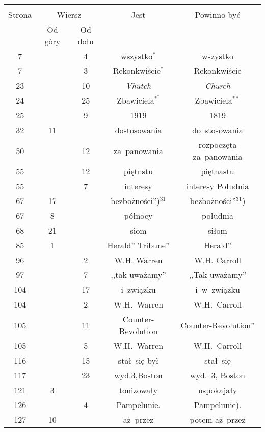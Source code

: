 \documentclass[a4paper,11pt]{article}
\begin{document}
\newpage
{}
\begin{center}
  \begin{tabular}{|c|c|c|c|c|}
    \hline
    & \multicolumn{2}{c|}{} & & \\
    Strona & \multicolumn{2}{c|}{Wiersz} & Jest
                              & Powinno być \\ \cline{2-3}
    & Od góry & Od dołu & & \\
    \hline
    7   & &  4 & wszystko$^{ * }$ & wszystko \\
    7   & &  3 & Rekonkwiście$^{ * }$ & Rekonkwiście \\
    23  & & 10 & \emph{Vhutch} & \emph{Church} \\
    24  & & 25 & Zbawiciela$^{ *^{ * } }$ & Zbawiciela$^{ ** }$ \\
    25  & &  9 & 1919 & 1819 \\
    32  & 11 & & dostosowania & do~stosowania \\
    50  & & 12 & za~panowania & rozpoczęta za~panowania \\
    55  & & 12 & piętnstu & piętnastu \\
    55  & &  7 & interesy & interesy Południa \\
    67  & 17 & & bezbożności'')$^{ 31 }$ & bezbożności''$^{ 31 }$) \\
    67  &  8 & & północy & południa \\
    68  & 21 & & siom & siłom \\
    85  &  1 & & Herald'' Tribune'' & Herald'' \\
    96  & &  2 & W.H. Warren & W.H. Carroll \\
    97  & &  7 & ,,tak uważamy'' & ,,Tak uważamy'' \\
    104 & & 17 & i~związku & i~w~związku \\
    104 & &  2 & W.H.~Warren & W.H.~Carroll \\
    105 & & 11 & Counter-Revolution & Counter-Revolution'' \\
    105 & &  5 & W.H.~Warren & W.H.~Carroll \\
    116 & & 15 & stał~się był & stał~się \\
    117 & & 23 & wyd.3,Boston & wyd.~3, Boston \\
    121 &  3 & & tonizowały & uspokajały \\
    126 & &  4 & Pampelunie. & Pampelunie). \\
    127 & 10 & & aż~przez & potem aż~przez \\

\end{tabular}
\end{center}
\end{document}
